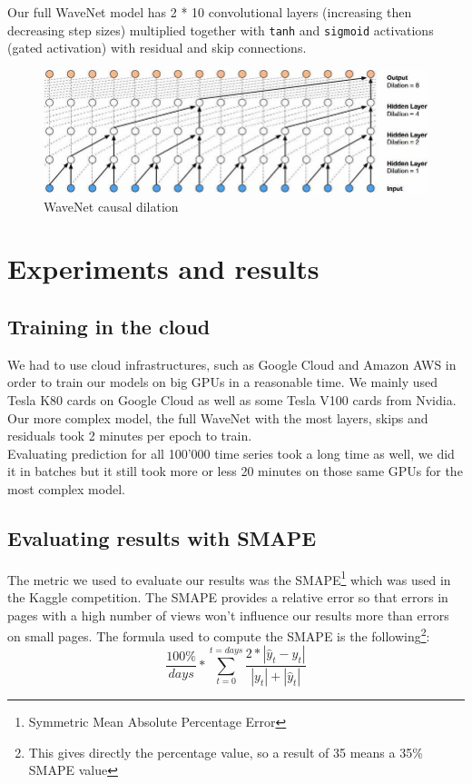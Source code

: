 \documentclass[11pt]{article}
\begin{document}
Our full WaveNet model has 2 * 10 convolutional layers (increasing then decreasing step sizes) multiplied together with \verb+tanh+ and \verb+sigmoid+ activations (gated activation) with residual and skip connections.
    \begin{figure}[H]
        \centering
        \includegraphics[width=.6\textwidth]{wavenet.jpg}
        \caption{WaveNet causal dilation}
    \end{figure}
    \newpage
    \section{Experiments and results}
    \subsection{Training in the cloud}
    We had to use cloud infrastructures, such as Google Cloud and Amazon AWS in order to train our models on big GPUs in a reasonable time. We mainly used Tesla K80 cards on Google Cloud as well as some Tesla V100 cards from Nvidia. Our more complex model, the full WaveNet with the most layers, skips and residuals took 2 minutes per epoch to train.\\

    Evaluating prediction for all 100'000 time series took a long time as well, we did it in batches but it still took more or less 20 minutes on those same GPUs for the most complex model.
    \subsection{Evaluating results with SMAPE}
    The metric we used to evaluate our results was the SMAPE\footnote{Symmetric Mean Absolute Percentage Error} which was used in the Kaggle competition. The SMAPE provides a relative error so that errors in pages with a high number of views won't influence our results more than errors on small pages. The formula used to compute the SMAPE is the following\footnote{This gives directly the percentage value, so a result of 35 means a 35\% SMAPE value}:
    \begin{equation*}
        \frac{100\%}{days} * \sum_{t=0}^{t=days}\frac{2 * |\hat{y}_t-y_t|}{|y_t| + |\hat{y}_t|}
    \end{equation*}
\end{document}
